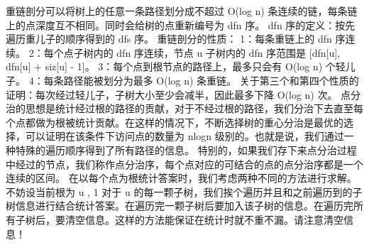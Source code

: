 {}重链剖分可以将树上的任意一条路径划分成不超过 \markdownRendererDollarSign{}O(\markdownRendererBackslash{}log n)\markdownRendererDollarSign{} 条连续的链，每条链上的点深度互不相同。同时会给树的点重新编号为 \markdownRendererDollarSign{}dfn\markdownRendererDollarSign{} 序。\markdownRendererParagraphSeparator
{}\markdownRendererDollarSign{}dfn\markdownRendererDollarSign{} 序的定义：按先遍历重儿子的顺序得到的 \markdownRendererDollarSign{}dfs\markdownRendererDollarSign{} 序。\markdownRendererParagraphSeparator
{}重链剖分的性质：\markdownRendererParagraphSeparator
{}1：每条重链上的 \markdownRendererDollarSign{}dfn\markdownRendererDollarSign{} 序连续。\markdownRendererHardLineBreak
{}2：每个点子树内的 \markdownRendererDollarSign{}dfn\markdownRendererDollarSign{} 序连续，节点 \markdownRendererDollarSign{}u\markdownRendererDollarSign{} 子树内的 \markdownRendererDollarSign{}dfn\markdownRendererDollarSign{} 序范围是 \markdownRendererDollarSign{}[dfn[u], dfn[u] + siz[u] - 1]\markdownRendererDollarSign{}。\markdownRendererHardLineBreak
{}3：每个点到根节点的路径上，最多只会有 \markdownRendererDollarSign{}O(\markdownRendererBackslash{}log n)\markdownRendererDollarSign{} 个轻儿子。\markdownRendererHardLineBreak
{}4：每条路径能被划分为最多 \markdownRendererDollarSign{}O(\markdownRendererBackslash{}log n)\markdownRendererDollarSign{} 条重链。\markdownRendererParagraphSeparator
{}关于第三个和第四个性质的证明：每次经过轻儿子，子树大小至少会减半，因此最多下降 \markdownRendererDollarSign{}O(\markdownRendererBackslash{}log n)\markdownRendererDollarSign{} 次。\markdownRendererInterblockSeparator
{}\markdownRendererInterblockSeparator
{}
\markdownRendererSectionEnd \markdownRendererSectionBegin
{}\markdownRendererInterblockSeparator
{}点分治的思想是统计经过根的路径的贡献，对于不经过根的路径，我们分治下去直至每个点都做为根被统计贡献。在这样的情况下，不断选择树的重心分治是最优的选择，可以证明在该条件下访问点的数量为\markdownRendererDollarSign{} nlogn \markdownRendererDollarSign{}级别的。也就是说，我们通过一种特殊的遍历顺序得到了所有路径的信息。\markdownRendererParagraphSeparator
{}特别的，如果我们存下来点分治过程中经过的节点，我们称作点分治序，每个点对应的可结合的点的点分治序都是一个连续的区间。\markdownRendererParagraphSeparator
{}在以每个点为根统计答案时，我们考虑两种不同的方法进行求解。\markdownRendererParagraphSeparator
{}不妨设当前根为\markdownRendererDollarSign{} u \markdownRendererDollarSign{},\markdownRendererParagraphSeparator
{}\markdownRendererDollarSign{} 1 \markdownRendererDollarSign{}对于\markdownRendererDollarSign{} u \markdownRendererDollarSign{}的每一颗子树，我们挨个遍历并且和之前遍历到的子树信息进行结合统计答案。在遍历完一颗子树后要加入该子树的信息。在遍历完所有子树后，要清空信息。这样的方法能保证在统计时就不重不漏。请注意清空信息！\markdownRendererParagraphSeparator
